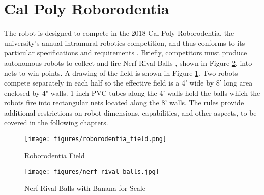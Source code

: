 \section{Cal Poly Roborodentia}
The robot is designed to compete in the 2018 Cal Poly Roborodentia, the university's annual intramural robotics competition, and thus conforms to its particular specifications and requirements \cite{roborodentia}. Briefly, competitors must produce autonomous robots to collect and fire Nerf Rival Balls \cite{hasbro_2018}, shown in Figure \ref{fig:nerf_rival_balls}, into nets to win points. A drawing of the field is shown in Figure \ref{fig:roborodentia_field}. Two robots compete separately in each half so the effective field is a 4' wide by 8' long area enclosed by 4" walls. 1 inch PVC tubes along the 4' walls hold the balls which the robots fire into rectangular nets located along the 8' walls. The rules provide additional restrictions on robot dimensions, capabilities, and other aspects, to be covered in the following chapters.
\begin{figure}[H]   %
	\centering \texttt{[image: figures/roborodentia\_field.png]}
	\caption{Roborodentia Field \cite{roborodentia}}	\label{fig:roborodentia_field}
\end{figure}
\begin{figure}[H]   %
	\centering \texttt{[image: figures/nerf\_rival\_balls.jpg]}
	\caption{Nerf Rival Balls with Banana for Scale}	\label{fig:nerf_rival_balls}
\end{figure}
